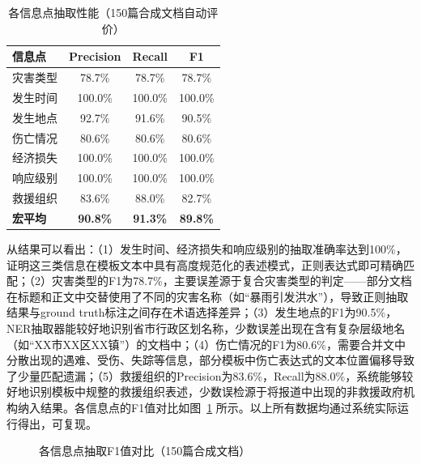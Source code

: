 \documentclass[12pt, a4paper]{ctexart}
\begin{document}
\begin{table}[H]
\centering
\caption{各信息点抽取性能（150篇合成文档自动评价）}
\label{tab:eval_synth}
\begin{tabular}{lccc}
\toprule
\textbf{信息点} & \textbf{Precision} & \textbf{Recall} & \textbf{F1} \\
\midrule
灾害类型 & 78.7\% & 78.7\% & 78.7\% \\
发生时间 & 100.0\% & 100.0\% & 100.0\% \\
发生地点 & 92.7\% & 91.6\% & 90.5\% \\
伤亡情况 & 80.6\% & 80.6\% & 80.6\% \\
经济损失 & 100.0\% & 100.0\% & 100.0\% \\
响应级别 & 100.0\% & 100.0\% & 100.0\% \\
救援组织 & 83.6\% & 88.0\% & 82.7\% \\
\midrule
\textbf{宏平均} & \textbf{90.8\%} & \textbf{91.3\%} & \textbf{89.8\%} \\
\bottomrule
\end{tabular}
\end{table}

从结果可以看出：（1）发生时间、经济损失和响应级别的抽取准确率达到100\%，证明这三类信息在模板文本中具有高度规范化的表述模式，正则表达式即可精确匹配；（2）灾害类型的F1为78.7\%，主要误差源于复合灾害类型的判定——部分文档在标题和正文中交替使用了不同的灾害名称（如``暴雨引发洪水''），导致正则抽取结果与ground truth标注之间存在术语选择差异；（3）发生地点的F1为90.5\%，NER抽取器能较好地识别省市行政区划名称，少数误差出现在含有复杂层级地名（如``XX市XX区XX镇''）的文档中；（4）伤亡情况的F1为80.6\%，需要合并文中分散出现的遇难、受伤、失踪等信息，部分模板中伤亡表达式的文本位置偏移导致了少量匹配遗漏；（5）救援组织的Precision为83.6\%，Recall为88.0\%，系统能够较好地识别模板中规整的救援组织表述，少数误检源于将报道中出现的非救援政府机构纳入结果。各信息点的F1值对比如图~\ref{fig:f1_scores} 所示。以上所有数据均通过系统实际运行得出，可复现。

\begin{figure}[H]
\centering
{}
\caption{各信息点抽取F1值对比（150篇合成文档）}
\label{fig:f1_scores}
\end{figure}
\end{document}
